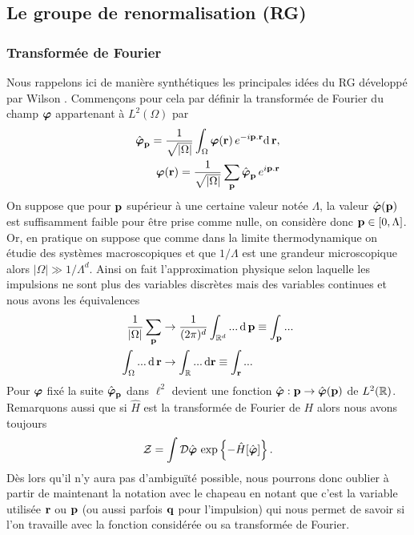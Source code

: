 \documentclass[10pt]{article}
\begin{document}
\begin{multicols}{2}
\vspace*{11pt}
\subsection{Le groupe de renormalisation (RG)}


\subsubsection{Transformée de Fourier}

Nous rappelons ici de manière synthétiques les principales idées du RG développé par Wilson \cite{wilson1971renormalization, wilson1971renormalization2,fisher1998renormalization}. Commençons pour cela par définir la transformée de Fourier du champ $\boldsymbol{ \varphi}$ appartenant à $L^2(\Omega)$ par 
\begin{equation}
\begin{split}
\hat{\boldsymbol{ \varphi}}_{\bf p} = \frac{1}{\sqrt{|\Omega|}}\int_\Omega \boldsymbol{ \varphi}({\bf r}) \, e^{-i {\bf p} . {\bf r}} \text{d} \, {\bf r}, \\
\boldsymbol{ \varphi}({\bf r}) = \frac{1}{\sqrt{|\Omega|}}\sum_{\bf p} \hat{\boldsymbol{ \varphi}}_{\bf p} \, e^{i {\bf p}  .{\bf r}}
\end{split} 	
\end{equation}
On suppose que pour ${\bf p}$ supérieur à une certaine valeur notée $\Lambda$, la valeur $\hat{\boldsymbol{ \varphi}}({\bf p})$ est suffisamment faible pour être prise comme nulle, on considère donc ${\bf p} \in [0, \Lambda]$. Or, en pratique on suppose que comme dans la limite thermodynamique on étudie des systèmes macroscopiques et que $1/\Lambda$ est une grandeur microscopique alors $|\Omega|\gg 1/\Lambda^d$. Ainsi on fait l'approximation physique selon laquelle les impulsions ne sont plus des variables discrètes mais des variables continues et nous avons les équivalences  
\begin{equation}
\begin{split}
	\frac{1}{|\Omega|} \sum_{{\bf p}} & \rightarrow \frac{1}{(2\pi)^d} \int_{\mathbb{R}^d} ... \, \text{d} \, {\bf p}  \equiv \int_{\bf p} ... \\
	\int_\Omega	... \, \text{d} \, {\bf r} & \rightarrow \int_{\mathbb{R}} ... \, \text{d} {\bf r} \equiv \int_{\bf r} ...
\end{split}
\end{equation}
Pour $\boldsymbol{ \varphi}$ fixé la suite $\hat{\boldsymbol{ \varphi}}_{\bf p}$ dans $\ell^2$ devient une fonction $\hat{\boldsymbol{ \varphi}} : {\bf p} \rightarrow \hat{\boldsymbol{ \varphi}}({\bf p})$ de $L^2(\mathbb{R})$. 
Remarquons aussi que si $\hat{H}$ est la transformée de Fourier de $H$ alors nous avons toujours
\begin{equation}
\mathcal{Z} = \int \mathcal{D} \hat{\boldsymbol{ \varphi}} \, \exp\left\{- \hat{H}[\hat{\boldsymbol{ \varphi}}]\right\}. 
\end{equation} 
Dès lors qu'il n'y aura pas d'ambiguïté possible, nous pourrons donc oublier à partir de maintenant la notation avec le chapeau en notant que c'est la variable utilisée ${\bf r}$ ou ${\bf p}$ (ou aussi parfois ${\bf q}$ pour l'impulsion) qui nous permet de savoir si l'on travaille avec la fonction considérée ou sa transformée de Fourier. \\



\end{multicols}
\end{document}
